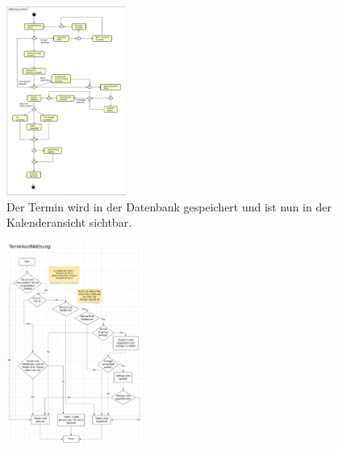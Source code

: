 \documentclass{sdqbeamer}
\begin{document}
\begin{frame}[plain]
    \begin{figure}
        \centering
        \includegraphics[width=0.35\textwidth]{pictures/figures/activity/buchungerstellen}
        \caption{Der Termin wird in der Datenbank gespeichert und ist nun in der Kalenderansicht sichtbar.}
        \label{fig:terminerstellenprozess}
    \end{figure}
\end{frame}

\begin{frame}[plain]
    \begin{figure}
        \centering
        \includegraphics[width=0.4\textwidth]{pictures/figures/activity/terminkonfliktloesung}
        \label{fig:terminkonflikt}
    \end{figure}
\end{frame}
\end{document}
